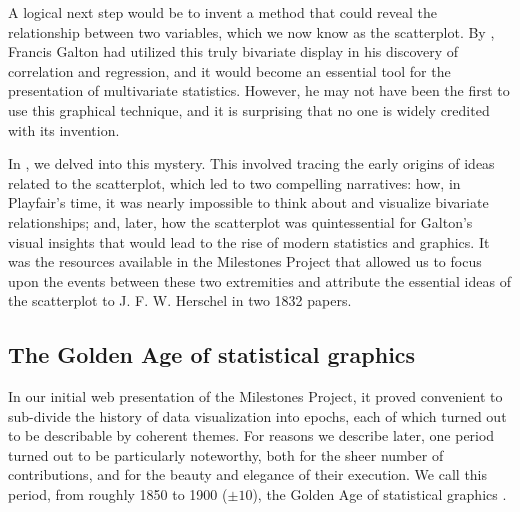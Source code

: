 A logical next step would be to invent a method that could reveal the relationship between two variables, which we now know as the scatterplot.  By \citeyear{Galton:1886}, Francis Galton had utilized this truly bivariate display in his discovery of correlation and regression, and it would become an essential tool for the presentation of multivariate statistics. However, he may not have been the first to use this graphical technique, and it is surprising that no one is widely credited with its invention.

In \citet{FriendlyDenis:05:scat}, we delved into this mystery.  This involved tracing the early origins of ideas related to the scatterplot, which led to two compelling narratives: how, in Playfair's time, it was nearly impossible to think about and visualize bivariate relationships; and, later, how the scatterplot was quintessential for Galton's visual insights that would lead to the rise of modern statistics and graphics. It was the resources available in the Milestones Project that allowed us to focus upon the events between these two extremities and attribute the essential ideas of the scatterplot to J. F. W. Herschel in two 1832 papers.

\subsection{The Golden Age of statistical graphics}

In our initial web presentation of the Milestones Project, it proved convenient
to sub-divide the history of data visualization into epochs, each of which turned
out to be describable by coherent themes.  For reasons we describe later, one
period turned out to be particularly noteworthy, both for the sheer number of
contributions, and for the beauty and elegance of their execution. We call this period, from roughly 1850 to 1900 ($\pm 10$), the Golden Age of statistical graphics \citep{Friendly:2008:golden}.

